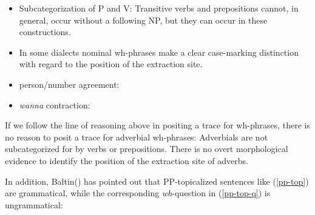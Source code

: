 \begin{itemize}
\item Subcategorization of P and V: Transitive verbs and prepositions 
cannot, in general, occur without a following NP, but they can occur in 
these constructions.\\


\item In some dialects nominal wh-phrases make a clear case-marking
distinction with regard to the position of the extraction site.\\


\item person/number agreement:\\


\item {\em wanna\/} contraction:\\


\end{itemize}

If we follow the line of reasoning above in positing a trace for
wh-phrases, there is no reason to posit a trace for adverbial
wh-phrases: Adverbials are not subcategorized for by verbs or
prepositions. There is no overt morphological evidence to identify the
position of the extraction site of adverbs. 

In addition, Baltin(\cite{Baltin}) has pointed out that PP-topicalized
sentences like (\ref{pp-top}) are grammatical, while the corresponding
{\it wh}-question in (\ref{pp-top-q}) is ungrammatical:


